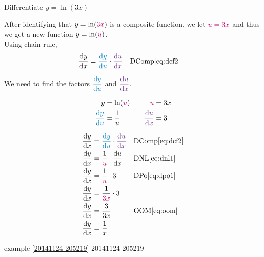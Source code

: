 \begin{example}[id:20141124-203850] \label{20141124-203850} \hfill \\

Differentiate $y=\ln (3x)$

\soln

\solnsteps

After identifying that $y=\ln (\cRed{3x})$ is a composite function, we let $\cRed{u=3x}$ and thus we get a new function $y=\ln (\cRed{u})$.\\

Using chain rule, 
\begin{align*}
\dydx &= \cBlue{\dydu} \cdot \cPurple{\dudx} && \text{DComp} \eqref{eq:dcf2}
\end{align*}

We need to find the factors $\cBlue{\dydu}$ and $\cPurple{\dudx}$.

\begin{alignat*}{2}
		y &= \ln (\cRed{u})				&\quad	 		\cRed{u}		&= 3x \\
	\cBlue{\dydu} &= \dfrac{1}{u}		&\quad 	 \cPurple{\dudx}	 &= 3 
\end{alignat*}

\begin{align*}
\dydx &= \cBlue{\dydu} \cdot \cPurple{\dudx} && \text{DComp} \eqref{eq:dcf2} \\
\dydx &= \dfrac{1}{\cRed{u}} \cdot \dudx && \text{DNL} \eqref{eq:dnl1} \\
\dydx &= \dfrac{1}{\cRed{u}} \cdot 3 && \text{DPo} \eqref{eq:dpo1} \\
\dydx &= \dfrac{1}{\cRed{3x}} \cdot 3 \\	%
\dydx &= \dfrac{3}{3x} && \text{OOM} \eqref{eq:oom} \\
\dydx &= \dfrac{1}{x} %
\end{align*}

\qdepend

\qdependlist

example \ref{20141124-205219}-20141124-205219

\end{example}


